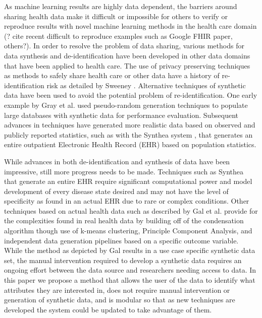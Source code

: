 \documentclass{article}
\begin{document}
As machine learning results are highly data dependent, the barriers around sharing health data make it difficult or impossible for others to verify or reproduce results with novel machine learning methods in the health care domain (? cite recent difficult to reproduce examples such as Google FHIR paper, others?). In order to resolve the problem of data sharing, various methods for data synthesis and de-identification have been developed in other data domains that have been applied to health care. The use of privacy preserving techniques as methods to safely share health care or other data have a history of re-identification risk as detailed by Sweeney \cite{sweeney_2002}. Alternative techniques of synthetic data have been used to avoid the potential problem of re-identification. One early example by Gray et al. \cite{gray_quickly_1994} used pseudo-random generation techniques to populate large databases with synthetic data for performance evaluation. Subsequent advances in techniques have generated more realistic data based on observed and publicly reported statistics, such as with the Synthea system \cite{walonoski_synthea:_2018}, that generates an entire outpatient Electronic Health Record (EHR) based on population statistics.

While advances in both de-identification and synthesis of data have been impressive, still more progress needs to be made. Techniques such as Synthea that generate an entire EHR require significant computational power and model development of every disease state desired and may not have the level of specificity as found in an actual EHR due to rare or complex conditions. Other techniques based on actual health data such as described by Gal et al. \cite{gal_data_2014} provide for the complexities found in real health data by building off of the condensation algorithm \cite{aggarwal_static_2008} though use of k-means clustering, Principle Component Analysis, and independent data generation pipelines based on a specific outcome variable. While the method as depicted by Gal results in a use case specific synthetic data set, the manual intervention required to develop a synthetic data requires an ongoing effort between the data source and researchers needing access to data. In this paper we propose a method that allows the user of the data to identify what attributes they are interested in, does not require manual intervention or generation of synthetic data, and is modular so that as new techniques are developed the system could be updated to take advantage of them.
\end{document}
